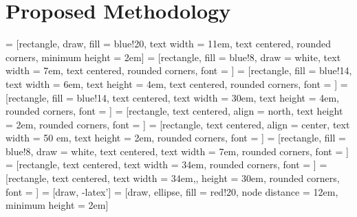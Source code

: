 \section{Proposed Methodology}
     = [rectangle, draw, fill = blue!20, text width = 11em, text centered, rounded corners, minimum height = 2em]
     = [rectangle, fill = blue!8, draw = white, text width = 7em, text centered, rounded corners, font = \scriptsize]
     = [rectangle, fill = blue!14, text width = 6em, text height = 4em, text centered, rounded corners, font = \scriptsize]
     = [rectangle, fill = blue!14, text centered, text width = 30em, text height = 4em, rounded corners, font = \tiny]
     = [rectangle, text centered, align = north, text height = 2em, rounded corners, font = \tiny]
     = [rectangle, text centered, align = center, text width = 50 em, text height = 2em, rounded corners, font = \tiny]
     = [rectangle, fill = blue!8, draw = white, text centered, text width = 7em, rounded corners, font = \scriptsize]
     = [rectangle, text centered, text width = 34em, rounded corners, font = \tiny]
     = [rectangle, text centered, text width = 34em,, height = 30em, rounded corners, font = \tiny]
     = [draw, -latex']
     = [draw, ellipse, fill = red!20, node distance = 12em, minimum height = 2em]
    
